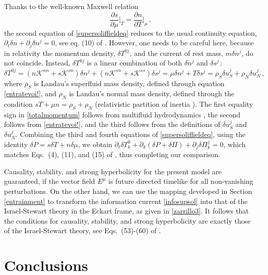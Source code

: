 \documentclass[a4paper, amsfonts, amssymb, amsmath, reprint, showkeys, nofootinbib, twoside, onecolumn,notitlepage]{revtex4-1}
\begin{document}
Thanks to the well-known Maxwell relation
\begin{equation}
    \dfrac{\partial s}{\partial \mu}\bigg|_{T}  = \dfrac{\partial n}{\partial T}\bigg|_{\mu} \, ,
\end{equation}
the second equation of \eqref{supersoliffieldeq} reduces to the usual continuity equation, $\partial_t \delta n+\partial_j \delta n^j=0$, see eq. (10) of \cite{Sears2010}. However, one needs to be careful here, because in relativity the momentum density, $\delta T^{0j}$, and the current of rest mass, $m \delta n^j$, do not coincide. Instead,  $\delta T^{0j}$ is a linear combination of both $\delta n^j$ and $\delta s^j \,$:
\begin{equation}\label{totalmomentum}
    \delta T^{0j} = (n\mathcal{K}^{nn}+s\mathcal{K}^{sn})\delta n^j +(n\mathcal{K}^{sn}+s\mathcal{K}^{ss})\delta s^j = \mu \delta n^j +T \delta s^j = \rho_S \delta u_S^j+\rho_N \delta u_N^j \, ,
\end{equation}
where $\rho_S$ is Landau's superfluid mass density, defined through equation \eqref{entratevoi!}, and $\rho_N$ is Landau's normal mass density, defined through the condition $sT+\mu n=\rho_S+\rho_N$ (relativistic partition of inertia \cite{GavassinoStabilityCarter2022}). The first equality sign in \eqref{totalmomentum} follows from multifluid hydrodynamics \cite{cool1995}, the second follows from \eqref{entratevoi!}, and the third follows from the definitions of $\delta u_S^j$ and $\delta u_N^j$. Combining the third and fourth equations of \eqref{supersoliffieldeq}, using the identity $\delta P =s\delta T +n \delta \mu$, we obtain $\partial_t \delta T^0_k+\partial_k (\delta P+\delta \Pi)+\partial_j\delta \Pi^j_k=0$, which matches Eqs.\ (4), (11), and (15) of \cite{Sears2010}, thus completing our comparison.


Causality, stability, and strong hyperbolicity for the present model are guaranteed, if the vector field $E^\mu$ is future directed timelike for all non-vanishing perturbations. On the other hand, we can use the mapping developed in Section \ref{entrainment} to transform the information current \eqref{infosupsol} into that of the Israel-Stewart theory in the Eckart frame, as given in   \eqref{zarrillo3}. It follows that the conditions for causality, stability, and strong hyperbolicity are exactly those of the Israel-Stewart theory, see Eqs.\ (53)-(60) of \cite{Hishcock1983}.


\section{Conclusions}
\label{conclusions}
\end{document}

